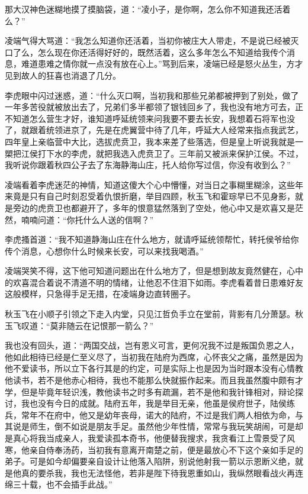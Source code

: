 那大汉神色迷糊地摸了摸脑袋，道：“凌小子，是你啊，怎么你不知道我还活着么？”

凌端气得大骂道：“我怎么知道你还活着，当初你被庄大人带走，不是说已经被灭口了么，怎么现在你还活得好好的，既然活着，这么多年怎么不知道给我传个消息，难道患难之情你就一点没有放在心上。”骂到后来，凌端已经是怒火丛生，方才见到故人的狂喜也消退了几分。

李虎眼中闪过迷惑，道：“什么灭口啊，当初我和那些兄弟都被押到了别处，做了一年多苦役就被放出去了，兄弟们多半都领了银钱回乡了，我也没有地方可去，正不知道怎么营生才好，谁知道呼延统领来问我要不要去长安，我想着石将军也没了，就跟着统领进京了，先是在虎翼营中待了几年，呼延大人经常来指点我武艺，四年皇上亲临营中大比，选拔虎贲卫，我本来差了些落选，但是皇上听说我就是一槊把江侯打下水的李虎，就把我选入虎贲卫了。三年前又被派来保护江侯。不过，我听说你跟着秋四公子去了东海静海山庄，托人给你写过信，你没有收到么？”

凌端看着李虎迷茫的神情，知道这傻大个心中懵懂，对当日之事糊里糊涂，这些年来竟是只有自己时刻忍受着仇恨折磨，举目四顾，秋玉飞和霍琮早已不见身影，就是旁边的虎贲卫也都避开了，多年的恨意猛然落到了空处，他心中又是欢喜又是茫然，喃喃问道：“你托什么人送的信啊？”

李虎搔首道：“我不知道静海山庄在什么地方，就请呼延统领帮忙，转托侯爷给你传个消息，心想你什么时候来长安，可以来找我喝酒。”

凌端哭笑不得，这下他可知道问题出在什么地方了，但是想到故友竟然健在，心中的欢喜混合着说不清道不明的情绪，让他忍不住泪下如雨。李虎看着昔日患难好友这般模样，只急得手足无措，在凌端身边直转圈子。

秋玉飞在小顺子引领之下走入内堂，只见江哲负手立在堂前，背影有几分萧瑟。秋玉飞叹道：“莫非随云在记恨那一箭么？”

我也没有回头，道：“两国交战，岂有恩义可言，更何况我不过是叛国负恩之人，他如此相待已经是仁至义尽了，当初我在陆府为西席，心怀丧父之痛，虽然是因为他不爱读书，所以立下各行其是的约定，可是实际上也是因为当时跟本没有心情教他读书，若不是他赤心相待，我也不能那么快就振作起来。而且我虽然腹中颇有才学，但是毕竟年轻识浅，教他读书之时多有疏漏，若不是他和我针锋相对，辩论探讨，我也没有今日的成就。陆府五年，我是举目无亲，他虽是侯府世子，陆侯练兵，常年不在府中，他又是幼年丧母，诺大的陆府，不过是我们两人相依为命，与其说是师生，倒不如说是朋友手足。虽然他少年性情，常常与我玩笑胡闹，可是却是真心将我当成亲人，我爱读孤本奇书，他便替我搜求，我贪看江上雪景受了风寒，他亲自侍奉汤药，当初我有意离开南楚之前，便是最放心不下这个亲如手足的弟子。可是如今却偏要亲自设计让他落入陷阱，别说他射我一箭以示恩断义绝，就是他真的要杀我，我也无法怪他，若非是陛下待我恩重如山，我纵然眼看战火再连绵三十载，也不会插手此战。”

